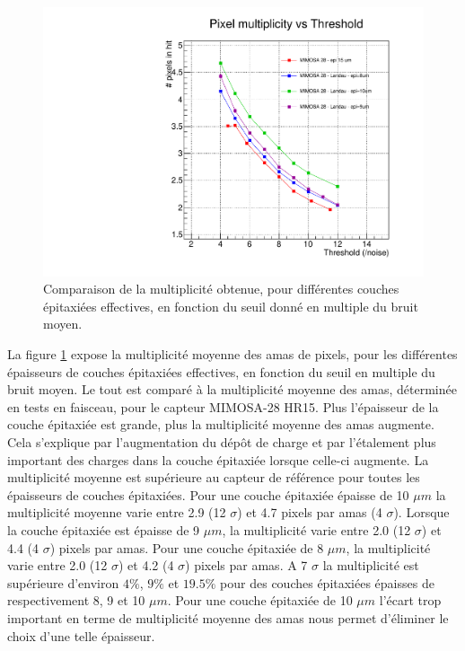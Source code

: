   \begin{figure}[!htb]
    \begin{center} 
     \includegraphics[scale=0.49]{./figures/Plots_resultat_simu/G4_landau_comparison_mult.pdf}
     \caption{Comparaison de la multiplicit\'e obtenue, pour diff\'erentes couches épitaxiées effectives, en fonction du seuil donn\'e en multiple du bruit moyen.}
     \label{fig:comp_landau_mult}
   \end{center}
   \end{figure}
   
   \medskip
   
   La figure \ref{fig:comp_landau_mult} expose la multiplicit\'e moyenne des amas de pixels, pour les diff\'erentes \'epaisseurs de couches épitaxiées effectives, en fonction du seuil en multiple du bruit moyen. Le tout est compar\'e \`a la multiplicit\'e moyenne des amas, d\'etermin\'ee en tests en faisceau, pour le capteur MIMOSA-28 HR15. Plus l'\'epaisseur de la couche épitaxiée est grande, plus la multiplicit\'e moyenne des amas augmente. Cela s'explique par l'augmentation du d\'ep\^ot de charge et par l'\'etalement plus important des charges dans la couche \'epitaxi\'ee lorsque celle-ci augmente. La multiplicit\'e moyenne est sup\'erieure au capteur de r\'ef\'erence pour toutes les \'epaisseurs de couches épitaxiées. Pour une couche épitaxiée \'epaisse de 10 $\mu m$ la multiplicit\'e moyenne varie entre 2.9 (12 $\sigma$) et 4.7 pixels par amas (4 $\sigma$). Lorsque la couche épitaxiée est \'epaisse de 9 $\mu m$, la multiplicit\'e varie entre 2.0 (12 $\sigma$) et 4.4 (4 $\sigma$) pixels par amas. Pour une couche épitaxiée de 8 $\mu m$, la multiplicit\'e varie entre 2.0 (12 $\sigma$) et 4.2 (4 $\sigma$) pixels par amas. A 7 $\sigma$ la multiplicit\'e est sup\'erieure d'environ $4 \%$, $9 \%$ et $19.5 \%$ pour des couches épitaxiées \'epaisses de respectivement 8, 9 et 10 $\mu m$. Pour une couche épitaxiée de 10 $\mu m$ l'\'ecart trop important en terme de multiplicit\'e moyenne des amas nous permet d'\'eliminer le choix d'une telle \'epaisseur.

